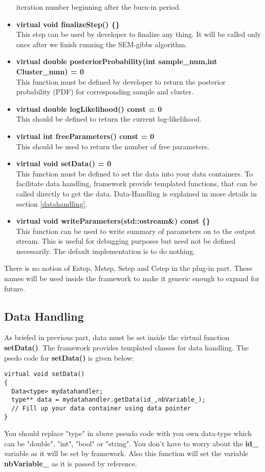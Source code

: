 \documentclass[a4paper,11pt]{article}
\begin{document}
\begin{itemize}
iteration number beginning after the burn-in period.
\item {\bf virtual void finalizeStep() \{\}}\\
This step can be used by developer to finalize any thing. It will be called only once after we
finish running the SEM-gibbs algorithm.
\item {\bf virtual double posteriorProbability(int sample\_num,int Cluster\_num) = 0}\\
This function must be defined by developer to return the posterior probability (PDF) for corresponding sample and cluster.
\item {\bf virtual double logLikelihood() const = 0}\\
This should be defined to return the current log-likelihood.
\item {\bf virtual int freeParameters() const = 0}\\
This should be used to return the number of free parameters.
\item {\bf virtual void setData() = 0}\\
This function must be defined to set the data into your data containers. To facilitate data handling, framework provide templated functions,
that can be called directly to get the data. Data-Handling is explained in more details in section \ref{datahandling}.
\item {\bf virtual void writeParameters(std::ostream\&) const \{\}}\\
This function can be used to write summary of parameters on to the output stream. This is useful for debugging purposes but need not be defined necessarily. The
default implementation is to do nothing.
\end{itemize}

There is no notion of Estep, Mstep, Sstep and Cstep in the plug-in part. These names will be used inside the framework to make
it generic enough to expand for future. 

\subsection{Data Handling}
As briefed in previous part, data must be set inside the virtual function {\bf setData()}. The framework provides templated classes for data handling. The 
psedo code for {\bf setData()} is given below:
\begin{lstlisting}
virtual void setData()
{
  Data<type> mydatahandler;
  type** data = mydatahandler.getData(id_,nbVariable_);
  // Fill up your data container using data pointer
}
\end{lstlisting}
You should replace "type" in above pseudo code with you own data-type which can be {"double", "int", "bool" or "string"}. You don't have to worry about the 
{\bf id\_} variable as it will be set by framework. Also this function will set the variable {\bf nbVariable\_} as it is passed by reference.
\end{document}

